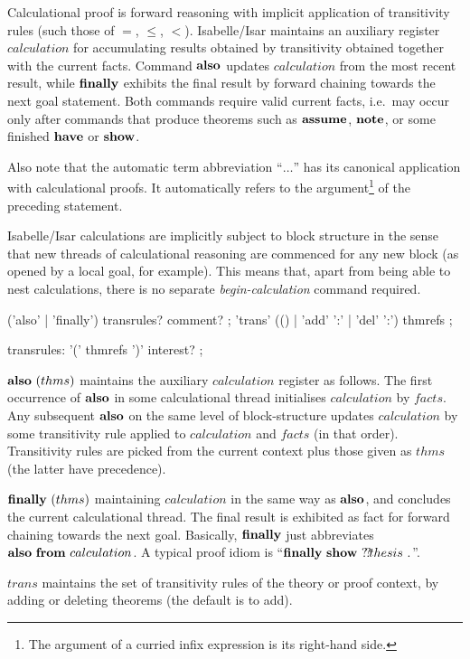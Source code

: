 Calculational proof is forward reasoning with implicit application of
transitivity rules (such those of $=$, $\le$, $<$).  Isabelle/Isar maintains
an auxiliary register $calculation$ for accumulating
results obtained by transitivity obtained together with the current facts.
Command ${\mathord{\mathbf{also}}}$ updates $calculation$ from the most recent result, while
${\mathord{\mathbf{finally}}}$ exhibits the final result by forward chaining towards the next goal
statement.  Both commands require valid current facts, i.e.\ may occur only
after commands that produce theorems such as ${\mathord{\mathbf{assume}}}$, ${\mathord{\mathbf{note}}}$, or
some finished ${\mathord{\mathbf{have}}}$ or ${\mathord{\mathbf{show}}}$.

Also note that the automatic term abbreviation ``$\dots$'' has its canonical
application with calculational proofs.  It automatically refers to the
argument\footnote{The argument of a curried infix expression is its right-hand
  side.} of the preceding statement.

Isabelle/Isar calculations are implicitly subject to block structure in the
sense that new threads of calculational reasoning are commenced for any new
block (as opened by a local goal, for example).  This means that, apart from
being able to nest calculations, there is no separate \emph{begin-calculation}
command required.

\begin{rail}
  ('also' | 'finally') transrules? comment?
  ;
  'trans' (() | 'add' ':' | 'del' ':') thmrefs
  ;

  transrules: '(' thmrefs ')' interest?
  ;
\end{rail}

\begin{descr}
\item [${\mathord{\mathbf{also}}}~(thms)$] maintains the auxiliary $calculation$ register as
  follows.  The first occurrence of ${\mathord{\mathbf{also}}}$ in some calculational thread
  initialises $calculation$ by $facts$. Any subsequent ${\mathord{\mathbf{also}}}$ on the same
  level of block-structure updates $calculation$ by some transitivity rule
  applied to $calculation$ and $facts$ (in that order).  Transitivity rules
  are picked from the current context plus those given as $thms$ (the latter
  have precedence).
  
\item [${\mathord{\mathbf{finally}}}~(thms)$] maintaining $calculation$ in the same way as
  ${\mathord{\mathbf{also}}}$, and concludes the current calculational thread.  The final result
  is exhibited as fact for forward chaining towards the next goal. Basically,
  ${\mathord{\mathbf{finally}}}$ just abbreviates ${\mathord{\mathbf{also}}}~{\mathord{\mathbf{from}}}~calculation$.  A typical proof
  idiom is ``$\FINALLY~\SHOW{}{\VVar{thesis}}~\DOT$''.
  
\item [$trans$] maintains the set of transitivity rules of the theory or proof
  context, by adding or deleting theorems (the default is to add).
\end{descr}

